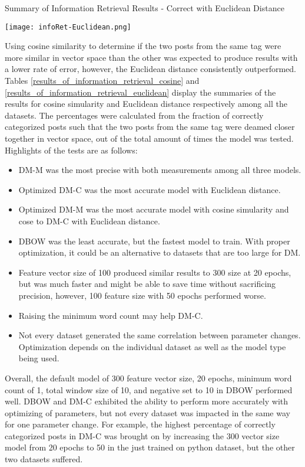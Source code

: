 \begin{table}[ht]
\caption{Summary of Information Retrieval Results - Correct with Euclidean Distance}
\label{results_of_information_retrieval_euclidean}
\centering
\texttt{[image: infoRet-Euclidean.png]}
\end{table}

Using cosine similarity to determine if the two posts from the same tag were more similar in vector space than the other was expected to produce results with a lower rate of error, however, the Euclidean distance consistently outperformed. Tables \ref{results_of_information_retrieval_cosine} and \ref{results_of_information_retrieval_euclidean} display the summaries of the results for cosine simularity and Euclidean distance respectively among all the datasets. The percentages were calculated from the fraction of correctly categorized posts such that the two posts from the same tag were deamed closer together in vector space, out of the total amount of times the model was tested. Highlights of the tests are as follows:

\begin{itemize}
  \item DM-M was the most precise with both measurements among all three models. 
  \item Optimized DM-C was the most accurate model with Euclidean distance.
  \item Optimized DM-M was the most accurate model with cosine simularity and cose to DM-C with Euclidean distance.
  \item DBOW was the least accurate, but the fastest model to train. With proper optimization, it could be an alternative to datasets that are too large for DM.
  \item Feature vector size of 100 produced similar results to 300 size at 20 epochs, but was much faster and might be able to save time without sacrificing precision, however, 100 feature size with 50 epochs performed worse.
  \item Raising the minimum word count may help DM-C.
  \item Not every dataset generated the same correlation between parameter changes. Optimization depends on the individual dataset as well as the model type being used.
\end{itemize}

Overall, the default model of 300 feature vector size, 20 epochs, minimum word count of 1, total window size of 10, and negative set to 10 in DBOW performed well. DBOW and DM-C exhibited the ability to perform more accurately with optimizing of parameters, but not every dataset was impacted in the same way for one parameter change. For example, the highest percentage of correctly categorized posts in DM-C was brought on by increasing the 300 vector size model from 20 epochs to 50 in the just trained on python dataset, but the other two datasets suffered.

